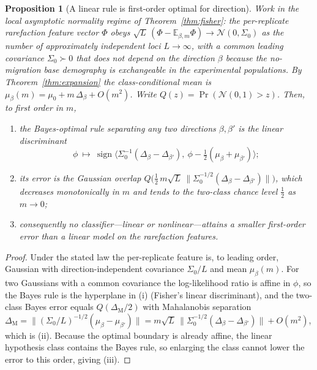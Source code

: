 \documentclass[11pt]{article}
\theoremstyle{plain}
\newtheorem{prop}[thm]{Proposition}
\theoremstyle{definition}
\theoremstyle{remark}
\begin{document}
\begin{prop}[A linear rule is first-order optimal for direction]\label{prop:linear-optimal}
Work in the local asymptotic normality regime of Theorem~\ref{thm:fisher}: the per-replicate
rarefaction feature vector $\Phi$ obeys $\sqrt{L}\,(\Phi-\mathbb{E}_{\beta,m}\Phi)\to
\mathcal{N}(0,\Sigma_0)$ as the number of approximately independent loci $L\to\infty$, with a
common leading covariance $\Sigma_0\succ0$ that does not depend on the direction $\beta$ because
the no-migration base demography is exchangeable in the experimental populations. By
Theorem~\ref{thm:expansion} the class-conditional mean is
$\mu_\beta(m)=\mu_0+m\,\Delta_\beta+O(m^2)$. Write $Q(z)=\Pr(\mathcal N(0,1)>z)$. Then, to first
order in $m$,
\begin{enumerate}
\item the Bayes-optimal rule separating any two directions $\beta,\beta'$ is the \emph{linear}
discriminant
\[
\phi\ \longmapsto\ \operatorname{sign}
\big\langle \Sigma_0^{-1}(\Delta_\beta-\Delta_{\beta'}),\ \phi-\tfrac12(\mu_\beta+\mu_{\beta'})\big\rangle;
\]
\item its error is the Gaussian overlap
$Q\!\big(\tfrac12\, m\sqrt{L}\,\lVert\Sigma_0^{-1/2}(\Delta_\beta-\Delta_{\beta'})\rVert\big)$,
which decreases monotonically in $m$ and tends to the two-class chance level $\tfrac12$ as
$m\to0$;
\item consequently no classifier---linear or nonlinear---attains a smaller first-order error than
a linear model on the rarefaction features.
\end{enumerate}
\end{prop}

\begin{proof}
Under the stated law the per-replicate feature is, to leading order, Gaussian with
direction-independent covariance $\Sigma_0/L$ and mean $\mu_\beta(m)$. For two Gaussians with a
common covariance the log-likelihood ratio is affine in $\phi$, so the Bayes rule is the
hyperplane in (i) (Fisher's linear discriminant), and the two-class Bayes error equals
$Q(\Delta_{\mathrm M}/2)$ with Mahalanobis separation
$\Delta_{\mathrm M}=\lVert(\Sigma_0/L)^{-1/2}(\mu_\beta-\mu_{\beta'})\rVert
=m\sqrt{L}\,\lVert\Sigma_0^{-1/2}(\Delta_\beta-\Delta_{\beta'})\rVert+O(m^2)$, which is (ii). Because
the optimal boundary is already affine, the linear hypothesis class contains the Bayes rule, so
enlarging the class cannot lower the error to this order, giving (iii).
\end{proof}
\end{document}
